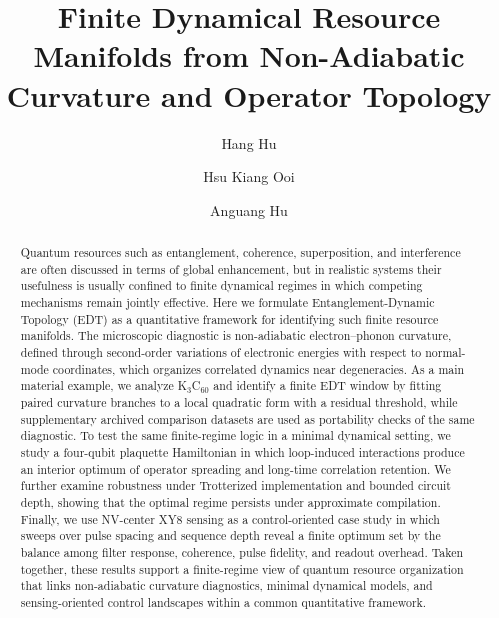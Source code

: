 ﻿\documentclass[aps,prx,reprint,superscriptaddress,longbibliography,floatfix]{revtex4-2}
\begin{document}
\title{Finite Dynamical Resource Manifolds from Non-Adiabatic Curvature and Operator Topology}

\author{Hang Hu}
\author{Hsu Kiang Ooi}
\author{Anguang Hu}

\begin{abstract}
Quantum resources such as entanglement, coherence, superposition, and interference are often discussed in terms of global enhancement, but in realistic systems their usefulness is usually confined to finite dynamical regimes in which competing mechanisms remain jointly effective. Here we formulate Entanglement-Dynamic Topology (EDT) as a quantitative framework for identifying such finite resource manifolds. The microscopic diagnostic is non-adiabatic electron--phonon curvature, defined through second-order variations of electronic energies with respect to normal-mode coordinates, which organizes correlated dynamics near degeneracies. As a main material example, we analyze K$_3$C$_{60}$ and identify a finite EDT window by fitting paired curvature branches to a local quadratic form with a residual threshold, while supplementary archived comparison datasets are used as portability checks of the same diagnostic. To test the same finite-regime logic in a minimal dynamical setting, we study a four-qubit plaquette Hamiltonian in which loop-induced interactions produce an interior optimum of operator spreading and long-time correlation retention. We further examine robustness under Trotterized implementation and bounded circuit depth, showing that the optimal regime persists under approximate compilation. Finally, we use NV-center XY8 sensing as a control-oriented case study in which sweeps over pulse spacing and sequence depth reveal a finite optimum set by the balance among filter response, coherence, pulse fidelity, and readout overhead. Taken together, these results support a finite-regime view of quantum resource organization that links non-adiabatic curvature diagnostics, minimal dynamical models, and sensing-oriented control landscapes within a common quantitative framework.
\end{abstract}

\maketitle
\end{document}
